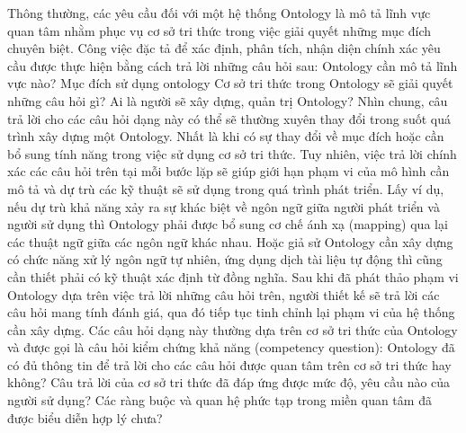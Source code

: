 Thông thường, các yêu cầu đối với một hệ thống Ontology là mô tả lĩnh vực quan tâm nhằm phục vụ cơ sở tri thức trong việc giải quyết những mục đích chuyên biệt. Công việc đặc tả để xác định, phân tích, nhận diện chính xác yêu cầu được thực hiện bằng cách trả lời những câu hỏi sau:
Ontology cần mô tả lĩnh vực nào?
Mục đích sử dụng ontology
Cơ sở tri thức trong Ontology sẽ giải quyết những câu hỏi gì?
Ai là người sẽ xây dựng, quản trị Ontology?
Nhìn chung, câu trả lời cho các câu hỏi dạng này có thể sẽ thường xuyên thay đổi trong suốt quá trình xây dựng một Ontology. Nhất là khi có sự thay đổi về mục đích hoặc cần bổ sung tính năng trong việc sử dụng cơ sở tri thức. Tuy nhiên, việc trả lời chính xác các câu hỏi trên tại mỗi bước lặp sẽ giúp giới hạn phạm vi của mô hình cần mô tả và dự trù các kỹ thuật sẽ sử dụng trong quá trình phát triển. Lấy ví dụ, nếu dự trù khả năng xảy ra sự khác biệt về ngôn ngữ giữa người phát triển và người sử dụng thì Ontology phải được bổ sung cơ chế ánh xạ (mapping) qua lại các thuật ngữ giữa các ngôn ngữ khác nhau. Hoặc giả sử Ontology cần xây dựng có chức năng xử lý ngôn ngữ tự nhiên, ứng dụng dịch tài liệu tự động thì cũng cần thiết phải có kỹ thuật xác định từ đồng nghĩa. Sau khi đã phát thảo phạm vi Ontology dựa trên việc trả lời những câu hỏi trên, người thiết kế sẽ trả lời các câu hỏi mang tính đánh giá, qua đó tiếp tục tinh chỉnh lại phạm vi của hệ thống cần xây dựng. Các câu hỏi dạng này thường dựa trên cơ sở tri thức của Ontology và được gọi là câu hỏi kiểm chứng khả năng (competency question):
Ontology đã có đủ thông tin để trả lời cho các câu hỏi được quan tâm trên cơ sở tri thức hay không?
Câu trả lời của cơ sở tri thức đã đáp ứng được mức độ, yêu cầu nào của người sử dụng?
Các ràng buộc và quan hệ phức tạp trong miền quan tâm đã được biểu diễn hợp lý chưa? 

